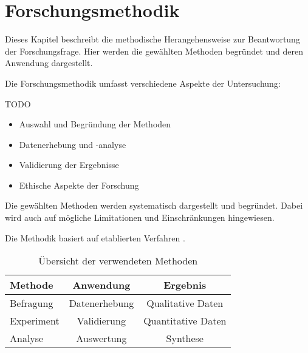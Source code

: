
\chapter{Forschungsmethodik}\label{cha:methodology}

Dieses Kapitel beschreibt die methodische Herangehensweise zur Beantwortung der Forschungsfrage. 
Hier werden die gewählten Methoden begründet und deren Anwendung dargestellt.

Die Forschungsmethodik umfasst verschiedene Aspekte der Untersuchung:

TODO

\begin{itemize}[leftmargin=0.63cm, label=\textbullet]
    \item Auswahl und Begründung der Methoden
    \item Datenerhebung und -analyse
    \item Validierung der Ergebnisse
    \item Ethische Aspekte der Forschung
\end{itemize}

Die gewählten Methoden werden systematisch dargestellt und begründet. Dabei wird auch auf mögliche Limitationen und Einschränkungen hingewiesen.

Die Methodik basiert auf etablierten Verfahren \cite{mustermann2023}.

\begin{table}[htbp]
\centering
\caption{Übersicht der verwendeten Methoden}
\label{tab:methoden}
\begin{tabular}{lcc}
\toprule
Methode & Anwendung & Ergebnis \\
\midrule
Befragung & Datenerhebung & Qualitative Daten \\
Experiment & Validierung & Quantitative Daten \\
Analyse & Auswertung & Synthese \\
\bottomrule
\end{tabular}
\end{table}

